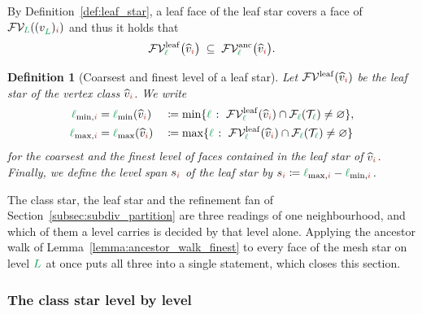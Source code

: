 \documentclass[a4paper, 12pt]{article}
\newcommand{\lmin}{\l_{\min}}
\newcommand{\lminIdx}[1]{\l_{\min,#1}}
\newcommand{\lmax}{\l_{\max}}
\newcommand{\lmaxIdx}[1]{\l_{\max,#1}}
\newcommand{\levelSpan}[1]{s_{#1}}
\newcommand{\green}{\color{ForestGreen}}
\newcommand{\brickred}{\color{BrickRed}}
\newcommand{\T}{\mathcal{T}}
\newcommand{\V}{\mathcal{V}}
\newcommand{\F}{\mathcal{F}}
\newcommand{\vertex}[2]{\freeQ{v}{}{#1}{#2}}
\newcommand{\vertexClass}[1]{\widehat{v}_{#1}}
\newcommand{\FVl}[1]{\F\V_{#1}}
\newcommand{\coarseIdxone}{{\brickred i}}
\renewcommand{\l}{{\green\ell}}
\renewcommand{\L}{{\green L}}
\newcommand{\freeQ}[4]{ ( {#1}^{#2}_{#3} )_{#4}}
\newtheorem{definition}[theorem]{Definition}
\theoremstyle{definition}
\theoremstyle{plain}
\numberwithin{equation}{section}
\newcommand{\FVleaf}[1]{\F\V^{\mathrm{leaf}}_{#1}}          %
\newcommand{\FVanc}[1]{\F\V^{\mathrm{anc}}_{#1}}            %
\begin{document}
By Definition~\ref{def:leaf_star}, a leaf face of the leaf star covers a face of $\FVl{\L}(\vertex{\L}{\coarseIdxone})$ and thus it holds that
\begin{equation}
    \label{eq:leaf_star_in_ancestry}
    \FVleaf{\l} \big( \vertexClass{\coarseIdxone} \big) \; \subseteq \; \FVanc{\l} \big( \vertexClass{\coarseIdxone} \big).
\end{equation}

\begin{definition}[Coarsest and finest level of a leaf star]
    \label{def:level_range}
    Let $\FVleaf{}(\vertexClass{\coarseIdxone})$ be the leaf star of the vertex class $\vertexClass{\coarseIdxone}$. We write
    \begin{alignat}{2}
        \label{eq:level_range}
        \lminIdx{\coarseIdxone} &= \lmin ( \vertexClass{\coarseIdxone} ) &&\coloneq \min \{ \l \; \colon \; \FVleaf{\l}(\vertexClass{\coarseIdxone}) \cap \F_\l(\T_\l) \neq \varnothing \}, \\
        \lmaxIdx{\coarseIdxone} &= \lmax ( \vertexClass{\coarseIdxone} ) &&\coloneq \max \{ \l \; \colon \; \FVleaf{\l}(\vertexClass{\coarseIdxone}) \cap \F_\l(\T_\l) \neq \varnothing \}
    \end{alignat}
    for the coarsest and the finest level of faces contained in the leaf star of $\vertexClass{\coarseIdxone}$. Finally, we define the \emph{level span} $\levelSpan{\coarseIdxone}$ of the leaf star by $\levelSpan{\coarseIdxone} \coloneq \lmaxIdx{\coarseIdxone} - \lminIdx{\coarseIdxone}$.
\end{definition}

The class star, the leaf star and the refinement fan of Section~\ref{subsec:subdiv_partition} are three readings of one neighbourhood, and which of them a level carries is decided by that level alone. Applying the ancestor walk of Lemma~\ref{lemma:ancestor_walk_finest} to every face of the mesh star on level $\L$ at once puts all three into a single statement, which closes this section.

\subsubsection{The class star level by level}
\label{subsubsec:level_split}
\end{document}
